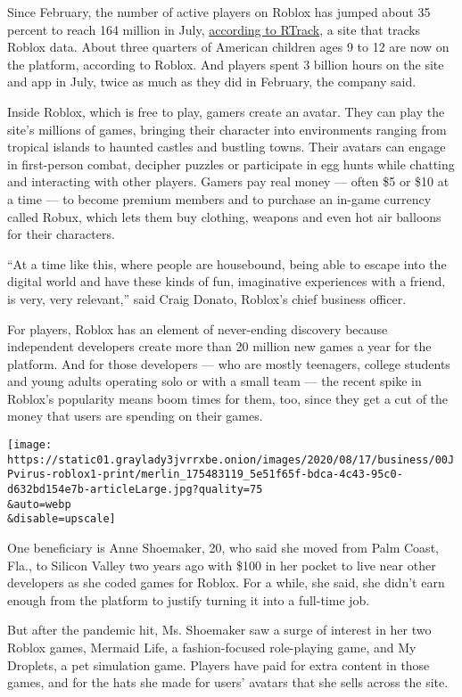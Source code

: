 Since February, the number of active players on Roblox has jumped about
35 percent to reach 164 million in July,
\href{https://blog.rtrack.live/index.php/2020/08/02/roblox-continues-upward-ascent-with-164-million-monthly-active-users/}{according
to RTrack}, a site that tracks Roblox data. About three quarters of
American children ages 9 to 12 are now on the platform, according to
Roblox. And players spent 3 billion hours on the site and app in July,
twice as much as they did in February, the company said.

Inside Roblox, which is free to play, gamers create an avatar. They can
play the site's millions of games, bringing their character into
environments ranging from tropical islands to haunted castles and
bustling towns. Their avatars can engage in first-person combat,
decipher puzzles or participate in egg hunts while chatting and
interacting with other players. Gamers pay real money --- often \$5 or
\$10 at a time --- to become premium members and to purchase an in-game
currency called Robux, which lets them buy clothing, weapons and even
hot air balloons for their characters.

``At a time like this, where people are housebound, being able to escape
into the digital world and have these kinds of fun, imaginative
experiences with a friend, is very, very relevant,'' said Craig Donato,
Roblox's chief business officer.

For players, Roblox has an element of never-ending discovery because
independent developers create more than 20 million new games a year for
the platform. And for those developers --- who are mostly teenagers,
college students and young adults operating solo or with a small team
--- the recent spike in Roblox's popularity means boom times for them,
too, since they get a cut of the money that users are spending on their
games.

\texttt{[image: https://static01.graylady3jvrrxbe.onion/images/2020/08/17/business/00JPvirus-roblox1-print/merlin\_175483119\_5e51f65f-bdca-4c43-95c0-d632bd154e7b-articleLarge.jpg?quality=75\\\&auto=webp\\\&disable=upscale]}

One beneficiary is Anne Shoemaker, 20, who said she moved from Palm
Coast, Fla., to Silicon Valley two years ago with \$100 in her pocket to
live near other developers as she coded games for Roblox. For a while,
she said, she didn't earn enough from the platform to justify turning it
into a full-time job.

But after the pandemic hit, Ms. Shoemaker saw a surge of interest in her
two Roblox games, Mermaid Life, a fashion-focused role-playing game, and
My Droplets, a pet simulation game. Players have paid for extra content
in those games, and for the hats she made for users' avatars that she
sells across the site.

